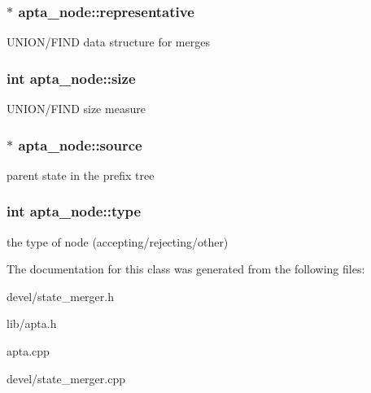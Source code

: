 \subsubsection[{\texorpdfstring{representative}{representative}}]{ $\ast$ apta\+\_\+node\+::representative}\hypertarget{classapta__node_aa2947d27209a9befd6458060419b2f43}{}\label{classapta__node_aa2947d27209a9befd6458060419b2f43}
U\+N\+I\+O\+N/\+F\+I\+ND data structure for merges 
\subsubsection[{\texorpdfstring{size}{size}}]{\setlength{\rightskip}{0pt plus 5cm}int apta\+\_\+node\+::size}\hypertarget{classapta__node_a24c9dae152b759bb6a2ebcae6bbc36d5}{}\label{classapta__node_a24c9dae152b759bb6a2ebcae6bbc36d5}
U\+N\+I\+O\+N/\+F\+I\+ND size measure 
\subsubsection[{\texorpdfstring{source}{source}}]{$\ast$ apta\+\_\+node\+::source}\hypertarget{classapta__node_a3988cbceb4424c44507237241a430aa4}{}\label{classapta__node_a3988cbceb4424c44507237241a430aa4}
parent state in the prefix tree 
\subsubsection[{\texorpdfstring{type}{type}}]{\setlength{\rightskip}{0pt plus 5cm}int apta\+\_\+node\+::type}\hypertarget{classapta__node_a9c1cf7c316ab485ff4435f90dda2766e}{}\label{classapta__node_a9c1cf7c316ab485ff4435f90dda2766e}
the type of node (accepting/rejecting/other) 

The documentation for this class was generated from the following files\+:\begin{DoxyCompactItemize}
\item 
devel/state\+\_\+merger.\+h\item 
lib/apta.\+h\item 
apta.\+cpp\item 
devel/state\+\_\+merger.\+cpp\end{DoxyCompactItemize}
